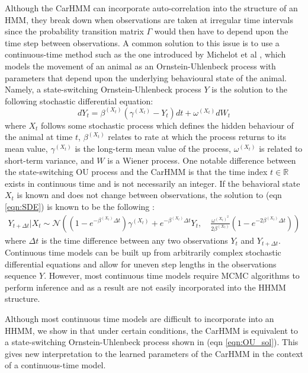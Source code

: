 Although the CarHMM can incorporate auto-correlation into the structure of an HMM, they break down when observations are taken at irregular time intervals since the probability transition matrix $\Gamma$ would then have to depend upon the time step between observations. A common solution to this issue is to use a continuous-time method such as the one introduced by Michelot et al \citep{Michelot:2019}, which models the movement of an animal as an Ornstein-Uhlenbeck process with parameters that depend upon the underlying behavioural state of the animal. Namely, a state-switching Ornstein-Uhlenbeck process $Y$ is the solution to the following stochastic differential equation:
%
\begin{equation}
    \label{eqn:SDE}
    dY_t = \beta^{(X_t)}(\gamma^{(X_t)} - Y_t)dt + \omega^{(X_t)} dW_t
\end{equation}
%
where $X_t$ follows some stochastic process which defines the hidden behaviour of the animal at time $t$, $\beta^{(X_t)}$ relates to rate at which the process returns to its mean value, $\gamma^{(X_t)}$ is the long-term mean value of the process, $\omega^{(X_t)}$ is related to short-term variance, and $W$ is a Wiener process. One notable difference between the state-switching OU process and the CarHMM is that the time index $t \in \mathbb{R}$ exists in continuous time and is not necessarily an integer. If the behavioral state $X_t$ is known and does not change between observations, the solution to (eqn \ref{eqn:SDE}) is known to be the following \citep{Michelot:2019}:
%
\begin{align}
Y_{t+\Delta t} | X_{t} \sim \mathcal{N}\left((1-e^{-\beta^{(X_t)}\Delta t})\gamma^{(X_t)} + e^{-\beta^{(X_t)}\Delta t} Y_t,\quad \frac{\omega^{(X_t)^2}}{2\beta^{(X_t)}} (1-e^{-2\beta^{(X_t)}\Delta t})\right)
\label{eqn:OU_sol}
\end{align}
%
where $\Delta t$ is the time difference between any two observations $Y_t$ and $Y_{t+\Delta t}$. Continuous time models can be built up from arbitrarily complex stochastic differential equations and allow for uneven step lengths in the observations sequence $Y$. However, most continuous time models require MCMC algorithms to perform inference and as a result are not easily incorporated into the HHMM structure.

Although most continuous time models are difficult to incorporate into an HHMM, we show in that under certain conditions, the CarHMM is equivalent to a state-switching Ornstein-Uhlenbeck process shown in (eqn \ref{eqn:OU_sol}). This gives new interpretation to the learned parameters of the CarHMM in the context of a continuous-time model.

